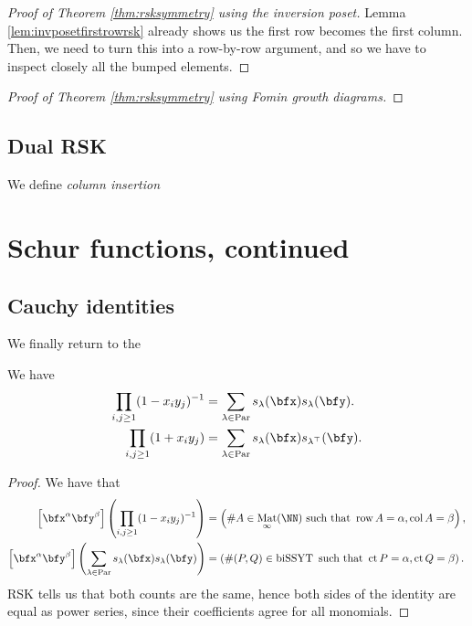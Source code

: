 \documentclass{article}
\DeclareMathOperator{\row}{row}
\DeclareMathOperator{\col}{col}
\DeclareMathOperator{\ct}{ct}
\DeclareMathOperator{\Par}{Par}
\DeclareMathOperator{\biSSYT}{biSSYT}
\DeclareMathOperator{\Mat}{Mat}
\begin{document}
\begin{proof}[Proof of Theorem \ref{thm:rsksymmetry} using the inversion poset]

    Lemma \ref{lem:invposetfirstrowrsk} already shows us the first row becomes the first column.
    Then, we need to turn this into a row-by-row argument, and so we have to inspect closely all the bumped elements.
    

\end{proof}

\begin{proof}[Proof of Theorem \ref{thm:rsksymmetry} using Fomin growth diagrams]
\end{proof}

\subsection{Dual RSK}

\begin{definition}
    We define \textit{column insertion}
\end{definition}

\section{Schur functions, continued}

\subsection{Cauchy identities}
We finally return to the 

\begin{theorem}
    We have
    \begin{align}
        \label{eq:CauchyIdentityForSchurs}
        \prod_{i,j \geq 1}(1-x_iy_j)^{-1}
        &=
        \sum_{\lambda\in\Par}
        s_\lambda(\bfx)s_\lambda(\bfy).
        \\
        \prod_{i,j \geq 1}(1+x_iy_j)
        &=
        \sum_{\lambda\in\Par}
        s_\lambda(\bfx)s_{\lambda^\top}(\bfy).
    \end{align}
\end{theorem}

\begin{proof}
    We have that
    \begin{align*}
        \left[\bfx^\alpha \bfy^\beta\right]
        \left(
            \prod_{i,j\geq1}(1-x_iy_j)^{-1}
        \right)
        &=
        \left(
            \#A \in \Mat_\infty(\NN) \text{ such that } \row A = \alpha, \col A = \beta
        \right), \\
        \left[\bfx^\alpha \bfy^\beta\right]
        \left(
            \sum_{\lambda\in\Par} 
            s_\lambda(\bfx) s_\lambda(\bfy)
        \right) 
        &= 
        \left(
            \#(P,Q) \in \biSSYT \text{ such that } \ct P = \alpha, \ct Q = \beta
        \right).
    \end{align*}
    RSK tells us that both counts are the same, hence both sides of the identity are equal as power series, since their coefficients agree for all monomials.
\end{proof}
\end{document}
